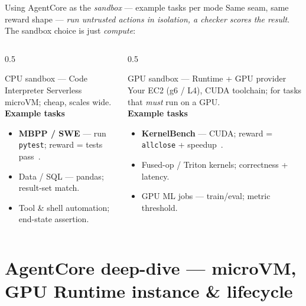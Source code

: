 \documentclass[aspectratio=169]{beamer}
\begin{document}
\begin{frame}{Using AgentCore as the \emph{sandbox} --- example tasks per mode}
  \footnotesize Same seam, same reward shape --- \emph{run untrusted actions in isolation, a checker scores
  the result}. The sandbox choice is just \emph{compute}:
  \begin{columns}[T]
    \begin{column}{0.5\textwidth}
      \begin{block}{CPU sandbox --- Code Interpreter}
        \scriptsize Serverless microVM; cheap, scales wide.
        \vspace{0.2em}\\ \textbf{Example tasks}
        \begin{itemize}\setlength\itemsep{0.05em}
          \item \textbf{MBPP / SWE} --- run \texttt{pytest}; reward = tests pass~\cite{mbpp,swebench}.
          \item Data / SQL --- pandas; result-set match.
          \item Tool \& shell automation; end-state assertion.
        \end{itemize}
      \end{block}
    \end{column}
    \begin{column}{0.5\textwidth}
      \begin{block}{GPU sandbox --- Runtime + GPU provider}
        \scriptsize Your EC2 (g6 / L4), CUDA toolchain; for tasks that \emph{must} run on a GPU.
        \vspace{0.2em}\\ \textbf{Example tasks}
        \begin{itemize}\setlength\itemsep{0.05em}
          \item \textbf{KernelBench} --- CUDA; reward = \texttt{allclose} + speedup~\cite{kernelbench}.
          \item Fused-op / Triton kernels; correctness + latency.
          \item GPU ML jobs --- train/eval; metric threshold.
        \end{itemize}
      \end{block}
    \end{column}
  \end{columns}
\end{frame}

\section{AgentCore deep-dive --- microVM, GPU Runtime instance \& lifecycle}
\end{document}
